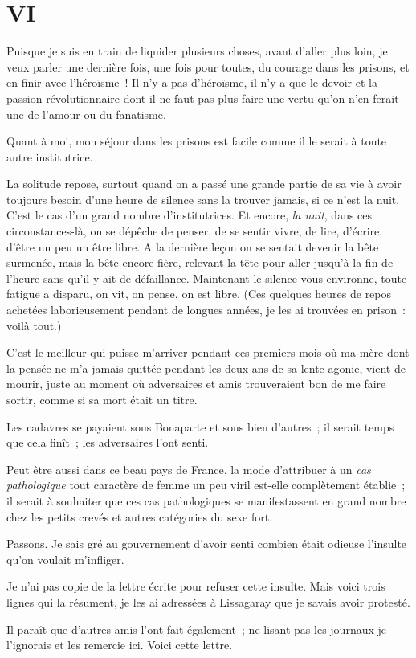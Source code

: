 \documentclass[french,twoside]{book} %
\newcommand\chapteropen{} %
\newcommand\chaptercont{} %
\begin{document}
\chapteropen
 \chapter[{VI}]{VI}
\label{p2.6}

\chaptercont
\noindent Puisque je suis en train de liquider plusieurs choses, avant d’aller plus loin, je veux parler une dernière fois, une fois pour toutes, du courage dans les prisons, et en finir avec l’héroïsme ! Il n’y a pas d’héroïsme, il n’y a que le devoir et la passion révolutionnaire dont il ne faut pas plus faire une vertu qu’on n’en ferait une de l’amour ou du fanatisme.\par
Quant à moi, mon séjour dans les prisons est facile comme il le serait à toute autre institutrice.\par
La solitude repose, surtout quand on a passé une grande partie de sa vie à avoir toujours besoin d’une heure de silence sans la trouver jamais, si ce n’est la nuit. C’est le cas d’un grand nombre d’institutrices. Et encore, \emph{la nuit}, dans ces circonstances-là, on se dépêche de penser, de se sentir vivre, de lire, d’écrire, d’être un peu un être libre. A la dernière leçon on se sentait devenir la bête surmenée, mais la bête encore  fière, relevant la tête pour aller jusqu’à la fin de l’heure sans qu’il y ait de défaillance. Maintenant le silence vous environne, toute fatigue a disparu, on vit, on pense, on est libre. (Ces quelques heures de repos achetées laborieusement pendant de longues années, je les ai trouvées en prison : voilà tout.)\par
C’est le meilleur qui puisse m’arriver pendant ces premiers mois où ma mère dont la pensée ne m’a jamais quittée pendant les deux ans de sa lente agonie, vient de mourir, juste au moment où adversaires et amis trouveraient bon de me faire sortir, comme si sa mort était un titre.\par
Les cadavres se payaient sous Bonaparte et sous bien d’autres ; il serait temps que cela finît ; les adversaires l’ont senti.\par
Peut être aussi dans ce beau pays de France, la mode d’attribuer à un \emph{cas pathologique} tout caractère de femme un peu viril est-elle complètement établie ; il serait à souhaiter que ces cas pathologiques se manifestassent en grand nombre chez les petits crevés et autres catégories du sexe fort.\par
Passons. Je sais gré au gouvernement d’avoir senti combien était odieuse l’insulte qu’on voulait m’infliger.\par
Je n’ai pas copie de la lettre écrite pour refuser  cette insulte. Mais voici trois lignes qui la résument, je les ai adressées à Lissagaray que je savais avoir protesté.\par
Il paraît que d’autres amis l’ont fait également ; ne lisant pas les journaux je l’ignorais et les remercie ici. Voici cette lettre.\par
\end{document}
